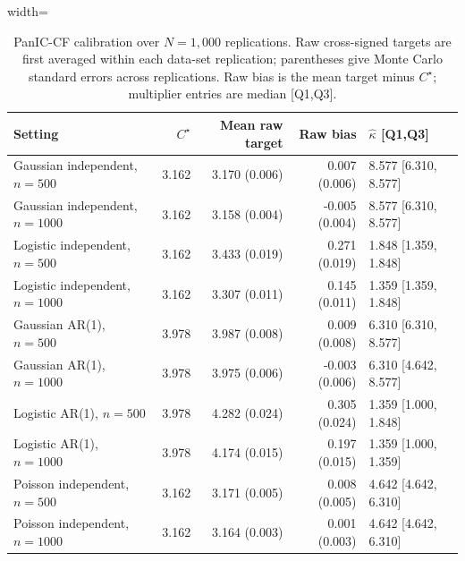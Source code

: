 \begin{table}[H]
\centering
\caption{PanIC-CF calibration over $N=1{,}000$ replications. Raw cross-signed targets are first averaged within each data-set replication; parentheses give Monte Carlo standard errors across replications. Raw bias is the mean target minus $C^\star$; multiplier entries are median [Q1,Q3].}
\label{Table: revised calibration}
\begin{adjustbox}{width=\textwidth}
\scriptsize
\begin{tabular}{lrrrl}
\hline
Setting & $C^\star$ & Mean raw target & Raw bias & $\widehat\kappa$ [Q1,Q3] \\
\hline
Gaussian independent, $n=500$ & 3.162 & 3.170 (0.006) & 0.007 (0.006) & 8.577 [6.310, 8.577] \\
Gaussian independent, $n=1000$ & 3.162 & 3.158 (0.004) & -0.005 (0.004) & 8.577 [6.310, 8.577] \\
Logistic independent, $n=500$ & 3.162 & 3.433 (0.019) & 0.271 (0.019) & 1.848 [1.359, 1.848] \\
Logistic independent, $n=1000$ & 3.162 & 3.307 (0.011) & 0.145 (0.011) & 1.359 [1.359, 1.848] \\
Gaussian AR(1), $n=500$ & 3.978 & 3.987 (0.008) & 0.009 (0.008) & 6.310 [6.310, 8.577] \\
Gaussian AR(1), $n=1000$ & 3.978 & 3.975 (0.006) & -0.003 (0.006) & 6.310 [4.642, 8.577] \\
Logistic AR(1), $n=500$ & 3.978 & 4.282 (0.024) & 0.305 (0.024) & 1.359 [1.000, 1.848] \\
Logistic AR(1), $n=1000$ & 3.978 & 4.174 (0.015) & 0.197 (0.015) & 1.359 [1.000, 1.359] \\
Poisson independent, $n=500$ & 3.162 & 3.171 (0.005) & 0.008 (0.005) & 4.642 [4.642, 6.310] \\
Poisson independent, $n=1000$ & 3.162 & 3.164 (0.003) & 0.001 (0.003) & 4.642 [4.642, 6.310] \\
\hline
\end{tabular}
\end{adjustbox}
\end{table}
